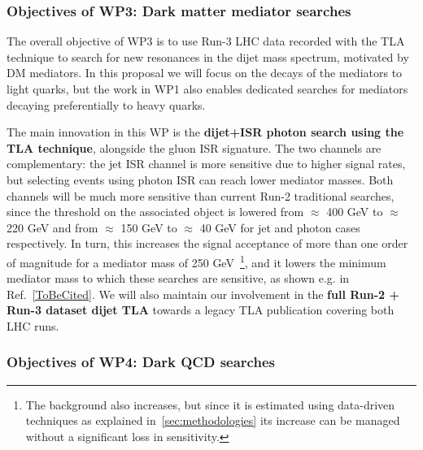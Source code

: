\subsubsection{Objectives of WP3: Dark matter mediator searches}

The overall objective of WP3 is to use Run-3 LHC data recorded with the TLA technique to search for new resonances in the dijet mass spectrum, motivated by DM mediators.
In this proposal we will focus on the decays of the mediators to light quarks, but the work in WP1 also enables dedicated searches for mediators decaying preferentially to heavy quarks. 

The main innovation in this WP is the \textbf{dijet+ISR photon search using the TLA technique}, alongside the gluon ISR signature. 
The two channels are complementary: the jet ISR channel is more sensitive due to higher signal rates, but selecting events using photon ISR can reach lower mediator masses. 
Both channels will be much more sensitive than current Run-2 traditional searches, since the threshold on the associated object is lowered from $\approx$ 400 GeV to $\approx$ 220 GeV and from $\approx$ 150 GeV to $\approx$ 40 GeV for jet and photon cases respectively.  
In turn, this increases the signal acceptance of more than one order of magnitude for a mediator mass of 250 GeV~\footnote{The background also increases, but since it is estimated using data-driven techniques as explained in~\ref{sec:methodologies} its increase can be managed without a significant loss in sensitivity.}, 
and it lowers the minimum mediator mass to which these searches are sensitive, as shown e.g. in Ref.~\ref{ToBeCited}.%
We will also maintain our involvement in the \textbf{full Run-2 + Run-3 dataset dijet TLA} towards a legacy TLA publication covering both LHC runs.

\subsubsection{Objectives of WP4: Dark QCD searches}


